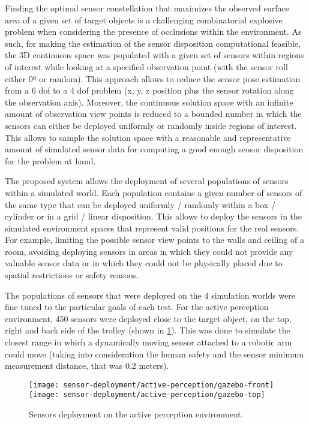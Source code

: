 Finding the optimal sensor constellation that maximizes the observed surface area of a given set of target objects is a challenging combinatorial explosive problem when considering the presence of occlusions within the environment. As such, for making the estimation of the sensor disposition computational feasible, the 3D continuous space was populated with a given set of sensors within regions of interest while looking at a specified observation point (with the sensor roll either 0º or random). This approach allows to reduce the sensor pose estimation from a 6 \gls{dof} to a 4 \gls{dof} problem (x, y, z position plus the sensor rotation along the observation axis). Moreover, the continuous solution space with an infinite amount of observation view points is reduced to a bounded number in which the sensors can either be deployed uniformly or randomly inside regions of interest. This allows to sample the solution space with a reasonable and representative amount of simulated sensor data for computing a good enough sensor disposition for the problem at hand.

The proposed system allows the deployment of several populations of sensors within a simulated world. Each population contains a given number of sensors of the same type that can be deployed uniformly / randomly within a box / cylinder or in a grid / linear disposition. This allows to deploy the sensors in the simulated environment spaces that represent valid positions for the real sensors. For example, limiting the possible sensor view points to the walls and ceiling of a room, avoiding deploying sensors in areas in which they could not provide any valuable sensor data or in which they could not be physically placed due to spatial restrictions or safety reasons.

The populations of sensors that were deployed on the 4 simulation worlds were fine tuned to the particular goals of each test. For the active perception environment, 450 sensors were deployed close to the target object, on the top, right and back side of the trolley (shown in \cref{fig:sensors-deployment-active-perception-environment}). This was done to simulate the closest range in which a dynamically moving sensor attached to a robotic arm could move (taking into consideration the human safety and the sensor minimum measurement distance, that was 0.2 meters).

\begin{figure}
	\centering
	\texttt{[image: sensor-deployment/active-perception/gazebo-front]}\hspace{1em}
	\texttt{[image: sensor-deployment/active-perception/gazebo-top]}
	\caption{Sensors deployment on the active perception environment.}
	\label{fig:sensors-deployment-active-perception-environment}
\end{figure}

